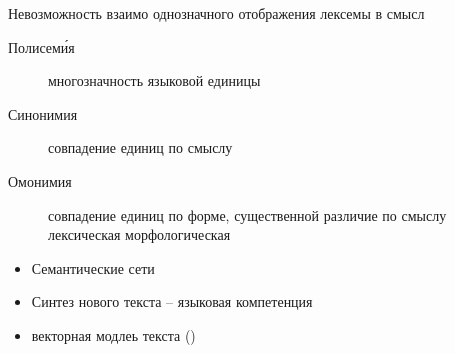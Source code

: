 Невозможность взаимо однозначного отображения лексемы в смысл
\begin{description}
	\item[Полисем\'ия] многозначность языковой единицы
	\item[Синонимия] совпадение единиц по смыслу
	\item[Омонимия] совпадение единиц по форме, существенной различие по смыслу
	лексическая
	морфологическая
\end{description}

\begin{itemize}
	\item Семантические сети
	\item Синтез нового текста -- языковая компетенция
	\item векторная модлеь текста ()
\end{itemize}


